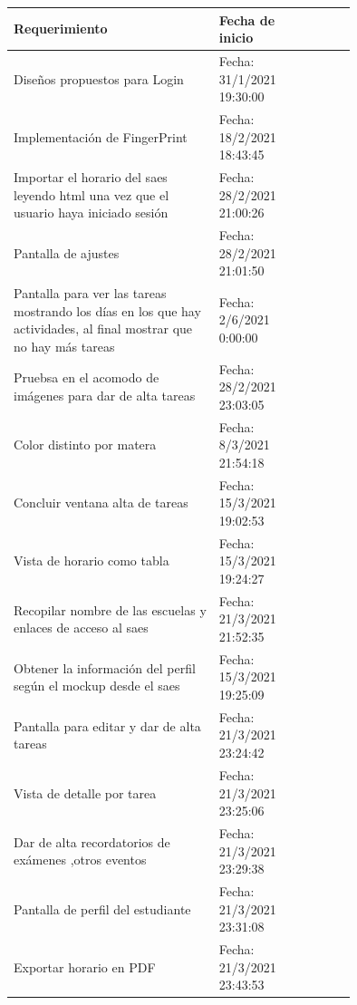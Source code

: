 \documentclass[10pt]{article}
\begin{document}
\centering
\begin{table}[H]
\begin{tabular}{|p{0.6\linewidth}|l |p{0.15\linewidth}|}
\hline
\textbf{Requerimiento}                                   & \textbf{Fecha de inicio} \\ \hline
{Diseños propuestos para Login}                          & Fecha: 31/1/2021 19:30:00 \\ \hline
{Implementación de FingerPrint}                          & Fecha: 18/2/2021 18:43:45 \\ \hline
{Importar el horario del saes leyendo html una vez que el usuario haya iniciado sesión} & Fecha: 28/2/2021 21:00:26 \\ \hline
{Pantalla de ajustes}                                    & Fecha: 28/2/2021 21:01:50   \\ \hline
{Pantalla para ver las tareas mostrando los días en los que hay actividades, al final mostrar que no hay más tareas}                                         &  Fecha: 2/6/2021 0:00:00 \\ \hline
{Pruebsa en el acomodo de imágenes para dar de alta tareas}  &  Fecha: 28/2/2021 23:03:05 \\ \hline
{Color distinto por matera}                               &  Fecha: 8/3/2021 21:54:18 \\ \hline
{Concluir ventana alta de tareas}                           &  Fecha: 15/3/2021 19:02:53 \\ \hline
{Vista de horario como tabla}                            &  Fecha: 15/3/2021 19:24:27 \\ \hline
{Recopilar nombre de las escuelas y enlaces de acceso al saes}    &  Fecha: 21/3/2021 21:52:35  \\ \hline
{Obtener la información del perfil según el mockup desde el saes} &  Fecha: 15/3/2021 19:25:09 \\ \hline
{Pantalla para editar y dar de alta tareas}   &  Fecha: 21/3/2021 23:24:42 \\ \hline
{Vista de detalle por tarea}                    & Fecha: 21/3/2021 23:25:06 \\ \hline
{Dar de alta recordatorios de exámenes ,otros eventos}  & Fecha: 21/3/2021 23:29:38  \\ \hline
{Pantalla de perfil del estudiante}                      &  Fecha: 21/3/2021 23:31:08 \\ \hline
{Exportar horario en PDF}                                &  Fecha: 21/3/2021 23:43:53 \\ \hline

\end{tabular}
\end{table}
\end{document}
